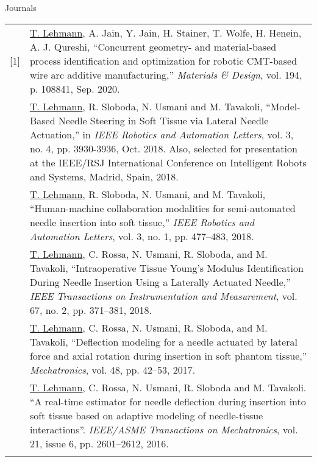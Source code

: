 

\begin{cventries}

  \cvpub
    {Journals}{
      \begin{longtable}{p{0.5cm} p{\textwidth - 0.5cm}}
        [1] & \underline{T. Lehmann}, A. Jain, Y. Jain, H. Stainer, T. Wolfe, H. Henein, A. J. Qureshi, ``Concurrent geometry- and material-based process identification and optimization for robotic CMT-based wire arc additive manufacturing,'' \emph{Materials \& Design}, vol. 194, p. 108841, Sep. 2020. \\\relax
        [2] & \underline{T. Lehmann}, R. Sloboda, N. Usmani and M. Tavakoli, ``Model-Based Needle Steering in Soft Tissue via Lateral Needle Actuation,'' in \emph{IEEE Robotics and Automation Letters}, vol. 3, no. 4, pp. 3930-3936, Oct. 2018. Also, selected for presentation at the IEEE/RSJ International Conference on Intelligent Robots and Systems, Madrid, Spain, 2018. \\\relax
        [3] & \underline{T. Lehmann}, R. Sloboda, N. Usmani, and M. Tavakoli, ``Human-machine collaboration modalities for semi-automated needle insertion into soft tissue,'' \emph{IEEE Robotics and Automation Letters}, vol. 3, no. 1, pp. 477–483, 2018. \\\relax
        [4] & \underline{T. Lehmann}, C. Rossa, N. Usmani, R. Sloboda, and M. Tavakoli, ``Intraoperative Tissue Young’s Modulus Identification During Needle Insertion Using a Laterally Actuated Needle,'' \emph{IEEE Transactions on Instrumentation and Measurement}, vol. 67, no. 2, pp. 371–381, 2018. \\\relax
        [5] & \underline{T. Lehmann}, C. Rossa, N. Usmani, R. Sloboda, and M. Tavakoli, ``Deflection modeling for a needle actuated by lateral force and axial rotation during insertion in soft phantom tissue,'' \emph{Mechatronics}, vol. 48, pp. 42–53, 2017. \\\relax
        [6] & \underline{T. Lehmann}, C. Rossa, N. Usmani, R. Sloboda and M. Tavakoli. ``A real-time estimator for needle deflection during insertion into soft tissue based on adaptive modeling of needle-tissue interactions''. \emph{IEEE/ASME Transactions on Mechatronics}, vol. 21, issue 6, pp. 2601--2612, 2016. \\\relax

\end{longtable}}
\end{cventries}
